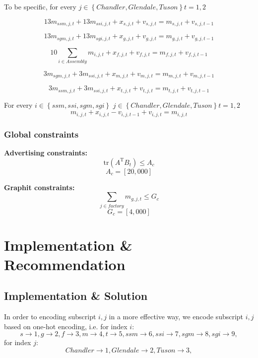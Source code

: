 \documentclass[12pt]{article}
\begin{document}
\noindent
To be specific, for every $j\in \left\{Chandler,Glendale,Tuson\right\} t=1,2$ 

$$
13m_{ssm,j,t}+13m_{ssi,j,t}+x_{s,j,t}+v_{s,j,t}=m_{s,j,t}+v_{s,j,t-1}
$$

$$
13m_{sgm,j,t}+13m_{sgi,j,t}+x_{g,j,t}+v_{g,j,t}=m_{g,j,t}+v_{g,j,t-1}
$$

$$
10\sum\limits_{i\in Assembly} {m_{i,j,t}} + x_{f,j,t} + v_{f,j,t} = m_{f,j,t}+v_{f,j,t-1}
$$

$$
3m_{sgm,j,t}+3m_{ssi,j,t}+x_{m,j,t}+v_{m,j,t}=m_{m,j,t}+v_{m,j,t-1}
$$

$$
3m_{ssm,j,t}+3m_{ssi,j,t}+x_{t,j,t}+v_{t,j,t}=m_{t,j,t}+v_{t,j,t-1}
$$

\noindent
For every $i\in \left\{ssm,ssi,sgm,sgi\right\}$
$j\in \left\{Chandler,Glendale,Tuson\right\}
t=1,2$ 
$$
m_{i,j,t}+x_{i,j,t}-v_{i,j,t-1}+v_{i,j,t}=m_{i,j,t}
$$

\noindent
\subsubsection{Global constraints }
\noindent
\textbf{Advertising constraints:}
\begin{equation}
\mathrm {tr}(A ^ \mathrm{ T }B_t)\leq A_c
\end{equation}
$$A_c = \left[20,000\right]$$

\noindent
\textbf{Graphit constraints:}
\begin{equation}
\sum \limits_{j\in factory}{m_{g,j,t}}\leq G_c
\end{equation}
$$G_c = \left[4,000\right]$$





\section{Implementation \& Recommendation}

\subsection{Implementation \& Solution}
In order to encoding subscript $i,j$ in a more effective way, we encode subscript $i,j$ based on one-hot encoding, i.e. for index $i$:
$$
        s \to 1,
        g \to 2,
        f \to 3,
        m \to 4,
        t \to 5,
        ssm \to 6,
        ssi \to 7,
        sgm \to 8,
        sgi \to 9,
$$
for index $j$:
$$
        Chandler \to 1,
        Glendale \to 2,
        Tuson \to 3,
$$
\end{document}
